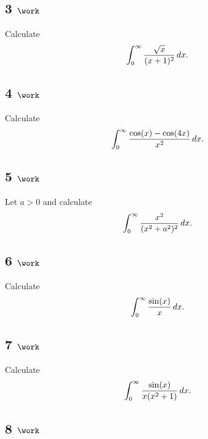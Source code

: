 \hypertarget{work-50}{%
\subsection{\texorpdfstring{3
\(\work\)}{3 \textbackslash work}}\label{work-50}}

Calculate
\begin{align*}
\int_0^\infty {\sqrt x \over (x+1)^2} \,dx
.\end{align*}

\hypertarget{work-51}{%
\subsection{\texorpdfstring{4
\(\work\)}{4 \textbackslash work}}\label{work-51}}

Calculate
\begin{align*}
\int_0^\infty {\cos(x) - \cos(4x) \over x^2} \, dx
.\end{align*}

\hypertarget{work-52}{%
\subsection{\texorpdfstring{5
\(\work\)}{5 \textbackslash work}}\label{work-52}}

Let \(a>0\) and calculate
\begin{align*}
\int_0^\infty {x^2 \over (x^2 + a^2)^2} \, dx
.\end{align*}

\hypertarget{work-53}{%
\subsection{\texorpdfstring{6
\(\work\)}{6 \textbackslash work}}\label{work-53}}

Calculate
\begin{align*}
\int_0^\infty {\sin(x) \over x}\, dx
.\end{align*}

\hypertarget{work-54}{%
\subsection{\texorpdfstring{7
\(\work\)}{7 \textbackslash work}}\label{work-54}}

Calculate
\begin{align*}
\int_0^\infty {\sin(x) \over x(x^2+1)}\, dx
.\end{align*}

\hypertarget{work-55}{%
\subsection{\texorpdfstring{8
\(\work\)}{8 \textbackslash work}}\label{work-55}}

